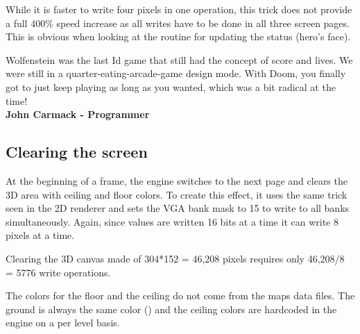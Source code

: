 While it is faster to write four pixels in one operation, this trick does not provide a full 400\% speed increase as all writes have to be done in all three screen pages. This is obvious when looking at the routine for updating the status (hero's face).\\
\par
\begin{minipage}{\textwidth}

\end{minipage}

 \begin{fancyquotes}
   Wolfenstein was the last Id game that still had the concept of score and lives.  We were still in a quarter-eating-arcade-game design mode. With Doom, you finally got to just keep playing as long as you wanted, which was a bit radical at the time!
 \bigskip \\
\textbf{John Carmack - Programmer}
 \end{fancyquotes}


\subsection{Clearing the screen}
At the beginning of a frame, the engine switches to the next page and clears the 3D area with ceiling and floor colors. To create this effect, it uses the same trick seen in the 2D renderer and sets the VGA bank mask to 15 to write to all banks simultaneously. Again, since values are written 16 bits at a time it can write 8 pixels at a time.\\ 
\par
\begin{minipage}{\textwidth}
 
 \end{minipage}
\par
Clearing the 3D canvas made of 304*152 = 46,208 pixels requires only 46,208/8 = 5776 write operations.\\
\par
The colors for the floor and the ceiling do not come from the maps data files. The ground is always the same color () and the ceiling colors are hardcoded in the engine on a per level basis.\\
\par
\begin{minipage}{\textwidth}
 
 \end{minipage}
\par



